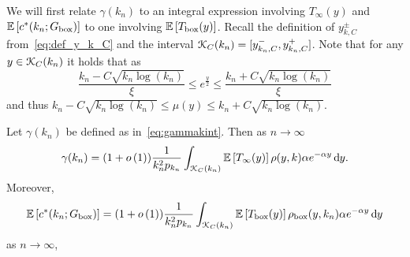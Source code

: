We will first relate $\gamma(k_n)$ to an integral expression involving $T_\infty(y)$ and $\mathbb{E}\left[c^\ast(k_n;G_{\mathrm{box}})\right]$ to one involving $\mathbb{E}\left[T_{\text{box}}(y)\right]$. Recall the definition of $y_{k,C}^\pm$ from~\eqref{eq:def_y_k_C} and the interval ${\mathcal K}_{C}(k_n) = [y_{k_n,C}^-, y_{k_n,C}^+]$. Note that for any $y \in {\mathcal K}_C(k_n)$ it holds that as
\begin{equation}\label{eq:def_K_C_set}
	\frac{k_n - C \sqrt{k_n \log(k_n)}}{\xi} \le e^{\frac{y}{2}}
	\le \frac{k_n + C \sqrt{k_n \log(k_n)}}{\xi}	
\end{equation}
and thus $k_n - C \sqrt{k_n \log(k_n)} \le \mu(y) \le k_n + C \sqrt{k_n \log(k_n)}$.

\begin{lemma}
Let $\gamma(k_n)$ be defined as in~\eqref{eq:gammakint}. Then as $n \to \infty$
\begin{equation}\label{eq:alt_gamma_kn}
	\gamma(k_n) = (1+o\left(1\right))\frac{1}{k_n^2 p_{k_n}} \int_{{\mathcal K}_{C}(k_n)} \mathbb{E}\left[T_\infty(y)\right] \rho(y,k) 
				\alpha e^{-\alpha y} \operatorname{\mathrm{d}\hspace{-2pt}} y. 
\end{equation}
Moreover,
\begin{equation}\label{eq:alt_c_ast_kn}
	\mathbb{E}\left[c^\ast(k_n;G_{\mathrm{box}})\right] = (1 + o\left(1\right)) \frac{1}{k_n^2 p_{k_n}} \int_{{\mathcal K}_{C}(k_n)} \mathbb{E}\left[T_{\text{box}}(y)\right]
		\rho_{\mathrm{box}}(y,k_n) \alpha e^{-\alpha y} \operatorname{\mathrm{d}\hspace{-2pt}} y
\end{equation}
as $n \to \infty$,
\end{lemma}

